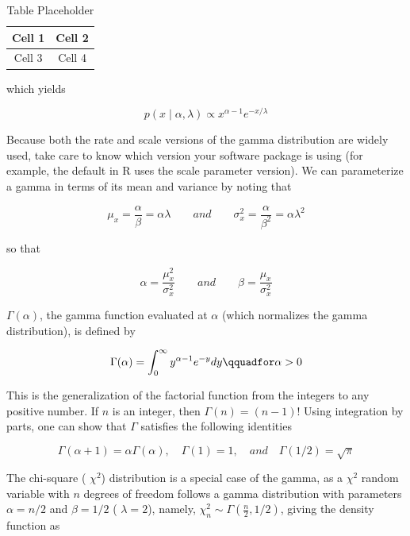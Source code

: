 \documentclass{article}
\begin{document}
\begin{table}[h]
\centering
\begin{tabular}{|c|c|}
\hline
Cell 1 & Cell 2 \\
\hline
Cell 3 & Cell 4 \\
\hline
\end{tabular}
\caption{Table Placeholder}
\end{table}

which yields

\begin{equation}
p(x\mid\alpha,\lambda)\propto x^{\alpha-1}e^{-x/\lambda}
\end{equation}

Because both the rate and scale versions of the gamma distribution are widely used, take care to know which version your software package is using (for example, the default in R uses the scale parameter version). We can parameterize a gamma in terms of its mean and variance by noting that

\begin{equation}
\mu_{x}=\frac{\alpha}{\beta}=\alpha\lambda\qquad and\qquad\sigma_{x}^{2}=\frac{\alpha}{\beta^{2}}=\alpha\lambda^{2}
\end{equation}

so that

\begin{equation}
\alpha=\frac{\mu_{x}^{2}}{\sigma_{x}^{2}}\qquad and\qquad\beta=\frac{\mu_{x}}{\sigma_{x}^{2}}
\end{equation}

 $ \Gamma(\alpha) $, the gamma function evaluated at  $ \alpha $ (which normalizes the gamma distribution), is defined by

\begin{equation}
\Gamma(\alpha)=\int_{0}^{\infty}y^{\alpha-1}e^{-y}d y\qquadfor\alpha>0
\end{equation}

This is the generalization of the factorial function from the integers to any positive number. If $n$ is an integer, then $\Gamma(n) = (n - 1)!$ Using integration by parts, one can show that $\Gamma$ satisfies the following identities

\begin{equation}
\Gamma(\alpha+1)=\alpha\Gamma(\alpha),\quad\Gamma(1)=1,\quad and\quad\Gamma(1/2)=\sqrt{\pi}
\end{equation}

The chi-square ( $ \chi^2 $) distribution is a special case of the gamma, as a  $ \chi^2 $ random variable with  $ n $ degrees of freedom follows a gamma distribution with parameters  $ \alpha = n/2 $ and  $ \beta = 1/2 $ ( $ \lambda = 2 $), namely,  $ \chi_n^2 \sim \Gamma(\frac{n}{2}, 1/2) $, giving the density function as
\end{document}
